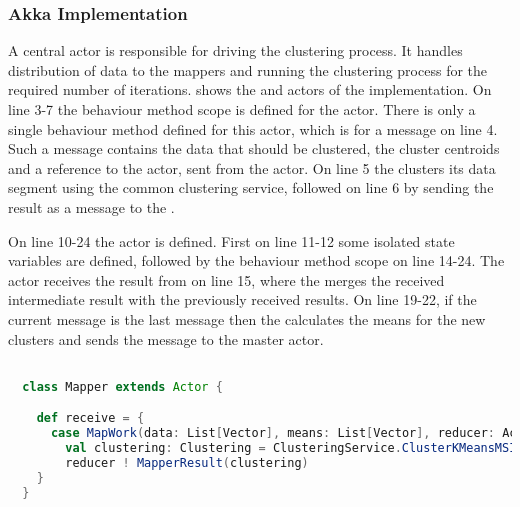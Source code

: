 {%
\subsubsection{Akka Implementation}
A central  actor is responsible for driving the clustering process. It handles distribution of data to the mappers and running the clustering process for the required number of iterations.  shows the  and  actors of the implementation. On line 3-7 the behaviour method scope is defined for the  actor. There is only a single behaviour method defined for this actor, which is for a  message on line 4. Such a message contains the data that should be clustered, the cluster centroids and a reference to the  actor, sent from the  actor. On line 5 the  clusters its data segment using the common clustering service, followed on line 6 by sending the result as a  message to the .

On line 10-24 the  actor is defined. First on line 11-12 some isolated state variables are defined, followed by the behaviour method scope on line 14-24.
The  actor receives the result from  on line 15, where the  merges the received intermediate result with the previously received results. On line 19-22, if the current message is the last message then the  calculates the means for the new clusters and sends the  message to the master actor.

\begin{lstlisting}[float,label=lst:actor_implementation,
  caption={Actor Implementation},
  language=Scala,  
  showspaces=false,
  showtabs=false,
  breaklines=true,
  showstringspaces=false,
  breakatwhitespace=true,
  commentstyle=\color{greencomments},
  keywordstyle=\color{bluekeywords},
  stringstyle=\color{redstrings}]  % Start your code-block

  class Mapper extends Actor {

    def receive = {
      case MapWork(data: List[Vector], means: List[Vector], reducer: ActorRef) =>
        val clustering: Clustering = ClusteringService.ClusterKMeansMSIncremental(data, means)
        reducer ! MapperResult(clustering)
    }
  }


\end{lstlisting}}
